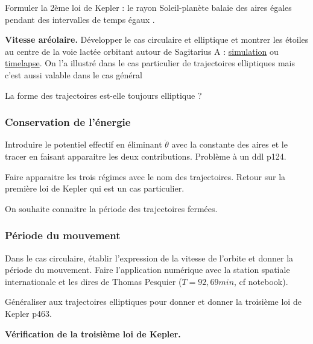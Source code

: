 Formuler la 2ème loi de Kepler : \og le rayon Soleil-planète balaie des aires égales pendant des intervalles de temps égaux \fg{}.

\begin{slide}
\textbf{Vitesse aréolaire.}
Développer le cas circulaire et elliptique et montrer les étoiles au centre de la voie lactée orbitant autour de Sagitarius A : \href{https://www.youtube.com/watch?v=wyuj7-XE8RE}{simulation} ou \href{https://www.youtube.com/watch?v=TF8THY5spmo}{timelapse}.
On l'a illustré dans le cas particulier de trajectoires elliptiques mais c'est aussi valable dans le cas général
\end{slide}

\begin{transition}
La forme des trajectoires est-elle toujours elliptique ?
\end{transition}

\subsubsection{Conservation de l'énergie}

Introduire le potentiel effectif en éliminant $\dot{\theta}$ avec la constante des aires et le tracer en faisant apparaitre les deux contributions.
Problème à un ddl \cite{Bocquet2002} p124.

Faire apparaitre les trois régimes avec le nom des trajectoires.
Retour sur la première loi de Kepler qui est un cas particulier.

\begin{transition}
On souhaite connaitre la période des trajectoires fermées.
\end{transition}

\subsubsection{Période du mouvement}

Dans le cas circulaire, établir l'expression de la vitesse de l'orbite et donner la période du mouvement.
Faire l'application numérique avec la station spatiale internationale et les dires de Thomas Pesquier ($T=\unit{92{,}69}{min}$, cf notebook).

Généraliser aux trajectoires elliptiques pour donner et donner la troisième loi de Kepler \cite{Michel2017} p463.

\begin{slide}
\textbf{Vérification de la troisième loi de Kepler.}
\end{slide}


